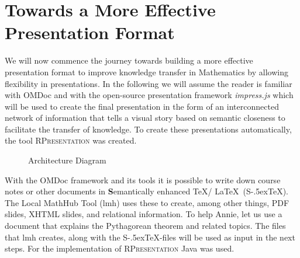 \documentclass{llncs}
\def\stex{\texorpdfstring{\raisebox{-.5ex}S\kern-.5ex\TeX}{sTeX}\xspace}
\newcommand{\sys}{\textsc{RPresentation}\xspace}
\begin{document}
\section{Towards a More Effective Presentation Format}
\label{sec:TowardsAMoreEffectivePresentationFormat}

We will now commence the journey towards building a more effective presentation format to improve knowledge transfer in Mathematics by allowing flexibility in presentations. In the following we will assume the reader is familiar with OMDoc \cite{Kohlhase:OMDoc1.2} and with the open-source presentation framework \textit{impress.js} \cite{JSImpress:npentrel14} which will be used to create the final presentation in the form of an interconnected network of information that tells a visual story based on semantic closeness to facilitate the transfer of knowledge. To create these presentations automatically, the tool \sys \cite{npentrel:npentrel15} was created. 

\begin{figure}
\vspace{-22pt}
  \begin{center}
\vspace{-6pt}
  \caption{Architecture Diagram}
  \label{fig:architecture}
\vspace{0pt}
  \end{center}
\end{figure}

\begin{figure}
\vspace{-50pt}
\end{figure}

With the OMDoc framework and its tools it is possible to write down course notes or other documents in \textbf{S}emantically enhanced \TeX / \LaTeX\ (\stex). The Local MathHub Tool (lmh) uses these to create, among other things, PDF slides, XHTML slides, and relational information. To help Annie, let us use a document that explains the Pythagorean theorem and related topics. The files that lmh creates, along with the \stex -files will be used as input in the next steps. For the implementation of  \sys Java was used.
\end{document}
